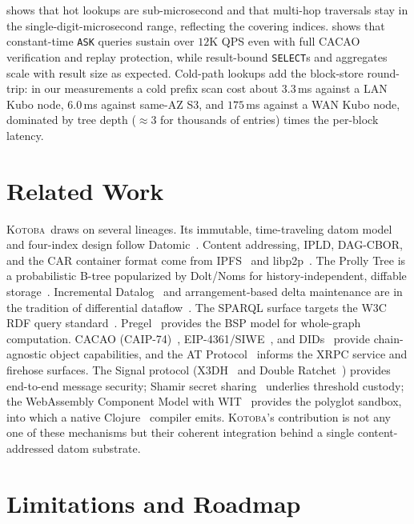 \documentclass[11pt]{article}
\newcommand{\kotoba}{\textsc{Kotoba}}
\begin{document}
 shows that hot lookups are sub-microsecond and that multi-hop
traversals stay in the single-digit-microsecond range, reflecting the covering
indices.  shows that constant-time \texttt{ASK} queries sustain
over $12$K QPS even with full CACAO verification and replay protection, while
result-bound \texttt{SELECT}s and aggregates scale with result size as expected.
Cold-path lookups add the block-store round-trip: in our measurements a cold
prefix scan cost about $3.3$\,ms against a LAN Kubo node, $6.0$\,ms against
same-AZ S3, and $175$\,ms against a WAN Kubo node, dominated by tree depth
($\approx 3$ for thousands of entries) times the per-block latency.

\section{Related Work}
\label{sec:related}

\kotoba\ draws on several lineages. Its immutable, time-traveling datom model and
four-index design follow Datomic~\cite{datomic}. Content addressing, IPLD,
DAG-CBOR, and the CAR container format come from IPFS~\cite{ipfs,ipld} and
libp2p~\cite{libp2p}. The Prolly Tree is a probabilistic B-tree popularized by
Dolt/Noms for history-independent, diffable storage~\cite{prollytree}.
Incremental Datalog~\cite{datalog} and arrangement-based delta maintenance are in
the tradition of differential dataflow~\cite{differential-dataflow}. The SPARQL
surface targets the W3C RDF query standard~\cite{sparql}.
Pregel~\cite{pregel} provides the BSP model for whole-graph computation. CACAO
(CAIP-74)~\cite{cacao}, EIP-4361/SIWE~\cite{siwe}, and DIDs~\cite{did} provide
chain-agnostic object capabilities, and the AT Protocol~\cite{atproto} informs the
XRPC service and firehose surfaces. The Signal protocol (X3DH~\cite{signal-x3dh}
and Double Ratchet~\cite{signal-doubleratchet}) provides end-to-end message
security; Shamir secret sharing~\cite{shamir} underlies threshold custody; the
WebAssembly Component Model with WIT~\cite{wasm-component} provides the polyglot
sandbox, into which a native Clojure~\cite{clojure} compiler emits. \kotoba's
contribution is not any one of these mechanisms but their coherent integration
behind a single content-addressed datom substrate.

\section{Limitations and Roadmap}
\label{sec:roadmap}
\end{document}
